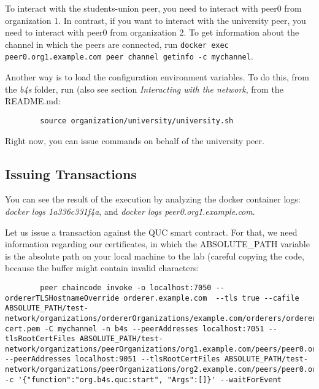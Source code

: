 \documentclass[12pt,a4paper]{article}
\theoremstyle{definition}
\begin{document}
    To interact with the students-union peer, you need to interact with peer0 from organization 1. In contrast, if you want to interact with the university peer, you need to interact with peer0 from organization 2.
    To get information about the channel in which the peers are connected, run \texttt{docker exec peer0.org1.example.com peer channel getinfo -c mychannel}.

    Another way is to load the configuration environment variables. To do this, from the \emph{b4s} folder, run (also see section \emph{Interacting with the network}, from the README.md:

    \begin{verbatim}
        source organization/university/university.sh
    \end{verbatim}

    Right now, you can issue commands on behalf of the university peer.

    \subsection{Issuing Transactions}

    You can see the result of the execution by analyzing the docker container logs: \emph{docker logs 1a336c331f4a}, and \emph{docker logs peer0.org1.example.com}.

    Let us issue a transaction against the QUC smart contract. For that, we need information regarding our certificates, in which the ABSOLUTE\_PATH variable is the absolute path on your local machine to the lab (careful copying the code, because the buffer might contain invalid characters:


    \begin{verbatim}
        peer chaincode invoke -o localhost:7050 --ordererTLSHostnameOverride orderer.example.com  --tls true --cafile ABSOLUTE_PATH/test-network/organizations/ordererOrganizations/example.com/orderers/orderer.example.com/msp/tlscacerts/tlsca.example.com-cert.pem -C mychannel -n b4s --peerAddresses localhost:7051 --tlsRootCertFiles ABSOLUTE_PATH/test-network/organizations/peerOrganizations/org1.example.com/peers/peer0.org1.example.com/tls/ca.crt --peerAddresses localhost:9051 --tlsRootCertFiles ABSOLUTE_PATH/test-network/organizations/peerOrganizations/org2.example.com/peers/peer0.org2.example.com/tls/ca.crt -c '{"function":"org.b4s.quc:start", "Args":[]}' --waitForEvent
    \end{verbatim}
\end{document}
